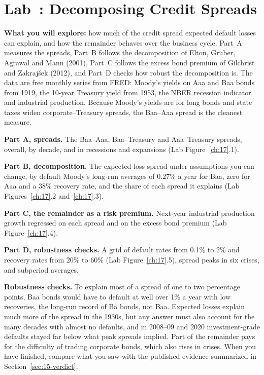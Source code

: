 \section{Lab~\thechapter: Decomposing Credit Spreads}
\label{sec:15-lab}

\textbf{What you will explore:} how much of the credit spread expected default losses can explain, and how the remainder behaves over the business cycle. Part~A measures the spreads, Part~B follows the decomposition of Elton, Gruber, Agrawal and Mann (2001), Part~C follows the excess bond premium of Gilchrist and Zakraj\v{s}ek (2012), and Part~D checks how robust the decomposition is. The data are free monthly series from FRED: Moody's yields on Aaa and Baa bonds from 1919, the 10-year Treasury yield from 1953, the NBER recession indicator and industrial production. Because Moody's yields are for long bonds and state taxes widen corporate--Treasury spreads, the Baa--Aaa spread is the cleanest measure.

\textbf{Part A, spreads.} The Baa--Aaa, Baa--Treasury and Aaa--Treasury spreads, overall, by decade, and in recessions and expansions (Lab Figure~\ref{ch:17}.1).

\textbf{Part B, decomposition.} The expected-loss spread under assumptions you can change, by default Moody's long-run averages of 0.27\% a year for Baa, zero for Aaa and a 38\% recovery rate, and the share of each spread it explains (Lab Figures~\ref{ch:17}.2 and~\ref{ch:17}.3).

\textbf{Part C, the remainder as a risk premium.} Next-year industrial production growth regressed on each spread and on the excess bond premium (Lab Figure~\ref{ch:17}.4).

\textbf{Part D, robustness checks.} A grid of default rates from 0.1\% to 2\% and recovery rates from 20\% to 60\% (Lab Figure~\ref{ch:17}.5), spread peaks in six crises, and subperiod averages.

\label{sec:15-stress}
\textbf{Robustness checks.} To explain most of a spread of one to two percentage points, Baa bonds would have to default at well over 1\% a year with low recoveries, the long-run record of Ba bonds, not Baa. Expected losses explain much more of the spread in the 1930s, but any answer must also account for the many decades with almost no defaults, and in 2008--09 and 2020 investment-grade defaults stayed far below what peak spreads implied. Part of the remainder pays for the difficulty of trading corporate bonds, which also rises in crises. When you have finished, compare what you saw with the published evidence summarized in Section~\ref{sec:15-verdict}.

